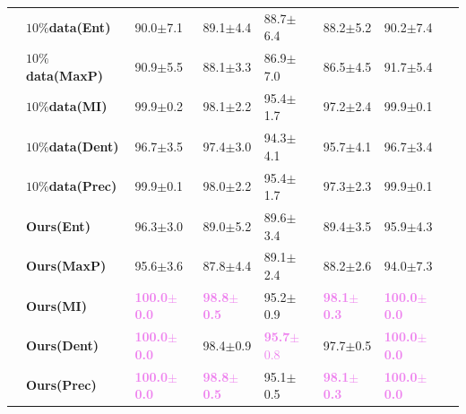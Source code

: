 \begin{table}[!t]
\begin{center}
\begin{tabular}{llllllll}
    \hline        
    & \textbf{$10\%$data(Ent)}  & 90.0$\pm$7.1 &89.1$\pm$4.4 & 88.7$\pm$6.4 &  88.2$\pm$5.2& 90.2$\pm$7.4 \\
              & \textbf{$10\%$data(MaxP)} & 90.9$\pm$5.5 & 88.1$\pm$3.3 &86.9$\pm$7.0 &  86.5$\pm$4.5 & 91.7$\pm$5.4 \\
              & \textbf{$10\%$data(MI)}& 99.9$\pm$0.2 & 98.1$\pm$2.2 & 95.4$\pm$1.7 &  97.2$\pm$2.4 & 99.9$\pm$0.1 \\
              & \textbf{$10\%$data(Dent)}  & 96.7$\pm$3.5 & 97.4$\pm$3.0 & 94.3$\pm$4.1 &  95.7$\pm$4.1 & 96.7$\pm$3.4 \\
               & \textbf{$10\%$data(Prec)}  & 99.9$\pm$0.1 & 98.0$\pm$2.2 & 95.4$\pm$1.7 &  97.3$\pm$2.3 & 99.9$\pm$0.1 \\
    \hline
              & \textbf{Ours(Ent)} & 96.3$\pm$3.0 &89.0$\pm$5.2 & 89.6$\pm$3.4 &  89.4$\pm$3.5& 95.9$\pm$4.3 \\
              & \textbf{Ours(MaxP)}  & 95.6$\pm$3.6 & 87.8$\pm$4.4 &89.1$\pm$2.4 &  88.2$\pm$2.6 & 94.0$\pm$7.3 \\
              & \textbf{Ours(MI)}  & \textcolor{violet}{\textbf{100.0$\pm$0.0}} & \textcolor{violet}{\textbf{98.8$\pm$0.5}} & 95.2$\pm$0.9 &  \textcolor{violet}{\textbf{98.1$\pm$0.3}} & \textcolor{violet}{\textbf{100.0$\pm$0.0}} \\
              & \textbf{Ours(Dent)}  & \textcolor{violet}{\textbf{100.0$\pm$0.0}} & 98.4$\pm$0.9 & \textcolor{violet}{\textbf{95.7}$\pm$0.8} &  97.7$\pm$0.5 & \textcolor{violet}{\textbf{100.0$\pm$0.0}} \\
               & \textbf{Ours(Prec)} & \textcolor{violet}{\textbf{100.0$\pm$0.0}} & \textcolor{violet}{\textbf{98.8$\pm$0.5}} & 95.1$\pm$0.5 &  \textcolor{violet}{\textbf{98.1$\pm$0.3}} & \textcolor{violet}{\textbf{100.0$\pm$0.0}} \\
    \toprule
  \end{tabular}
  \label{table:ablation-structure-appendix}
  \end{center}
  \vspace{-1.5em}
\end{table}
